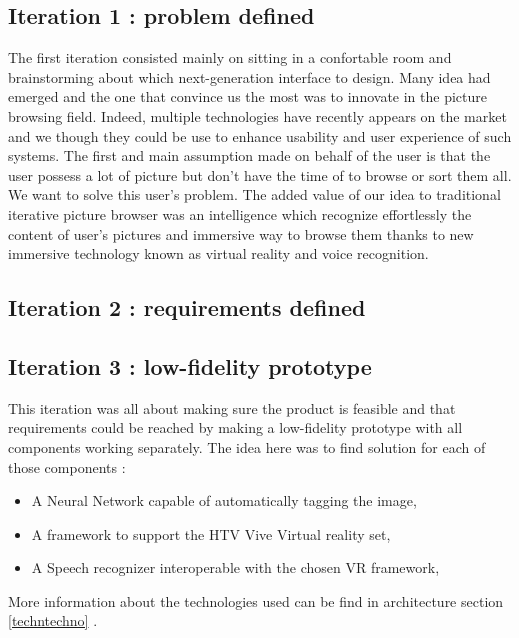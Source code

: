 \documentclass[11pt,a4paper]{article}
\begin{document}
\subsection{Iteration 1 : problem defined}

The first iteration consisted mainly on sitting in a confortable room and brainstorming about which next-generation interface to design. Many idea had emerged and the one that convince us the most was to innovate in the picture browsing field. Indeed, multiple technologies have recently appears on the market and we though they could be use to enhance usability and user experience of such systems.
The first and main assumption made on behalf of the user is that the user possess a lot of picture but don't have the time of to browse or sort them all. We want to solve this user's problem.
The added value of our idea to traditional iterative picture browser was an intelligence which recognize effortlessly the content of user's pictures and immersive way to browse them thanks to new immersive technology known as virtual reality and voice recognition.

\subsection{Iteration 2 : requirements defined}




\subsection{Iteration 3 : low-fidelity prototype}

This iteration was all about making sure the product is feasible and that requirements could be reached by making a low-fidelity prototype with all components working separately.
The idea here was to find solution for each of those components :
\begin{itemize}
	\item A Neural Network capable of automatically tagging the image,
	\item A framework to support the HTV Vive Virtual reality set,
	\item A Speech recognizer interoperable with the chosen VR framework,
\end{itemize}

More information about the technologies used can be find in architecture section \ref{techntechno} .
\end{document}

